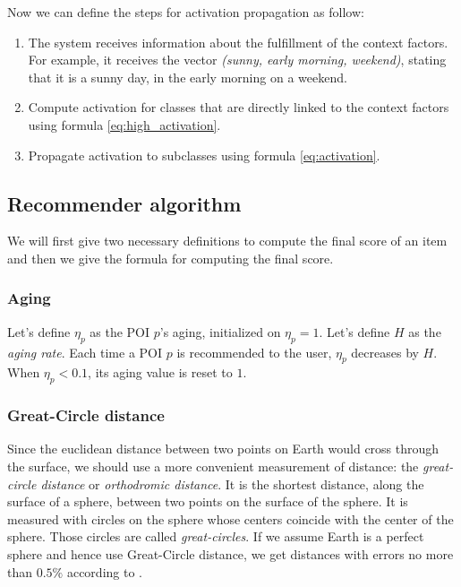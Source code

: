 Now we can define the steps for activation propagation as follow:
\begin{enumerate}
    \item The system receives information about the fulfillment of the context factors. For example, it receives the vector \textit{(sunny, early morning, weekend)}, stating that it is a sunny day, in the early morning on a weekend.
    
    \item Compute activation for classes that are directly linked to the context factors using formula \ref{eq:high_activation}.
    
    \item Propagate activation to subclasses using formula \ref{eq:activation}.
\end{enumerate}

\subsection{Recommender algorithm}

We will first give two necessary definitions to compute the final score of an item and then we give the formula for computing the final score.

\subsubsection{Aging}

Let's define $\eta_p$ as the POI $p$'s aging, initialized on $\eta_p = 1$. Let's define $H$ as the \textit{aging rate}. Each time a POI $p$ is recommended to the user, $\eta_p$ decreases by $H$. When $\eta_p < 0.1$, its aging value is reset to $1$. 

\subsubsection{Great-Circle distance}
Since the euclidean distance between two points on Earth would cross through the surface, we should use a more convenient measurement of distance: the \textit{great-circle distance} or \textit{orthodromic distance}. It is the shortest distance, along the surface of a sphere, between two points on the surface of the sphere. It is measured with circles on the sphere whose centers coincide with the center of the sphere. Those circles are called \textit{great-circles}. If we assume Earth is a perfect sphere and hence use Great-Circle distance, we get distances with errors no more than $0.5\%$ according to \cite{1997admiralty}. 

